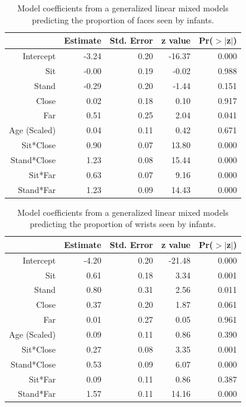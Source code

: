 \documentclass[english,man]{apa6}
\begin{document}
\begin{table}[ht]
\centering
\begin{tabular}{rrrrr}
  \hline
 & Estimate & Std. Error & z value & Pr($>$$|$z$|$) \\ 
  \hline
Intercept & -3.24 & 0.20 & -16.37 & 0.000 \\ 
  Sit & -0.00 & 0.19 & -0.02 & 0.988 \\ 
  Stand & -0.29 & 0.20 & -1.44 & 0.151 \\ 
  Close & 0.02 & 0.18 & 0.10 & 0.917 \\ 
  Far & 0.51 & 0.25 & 2.04 & 0.041 \\ 
  Age (Scaled) & 0.04 & 0.11 & 0.42 & 0.671 \\ 
  Sit*Close & 0.90 & 0.07 & 13.80 & 0.000 \\ 
  Stand*Close & 1.23 & 0.08 & 15.44 & 0.000 \\ 
  Sit*Far & 0.63 & 0.07 & 9.16 & 0.000 \\ 
  Stand*Far & 1.23 & 0.09 & 14.43 & 0.000 \\ 
   \hline
\end{tabular}
\caption{Model coefficients from a generalized linear mixed models predicting the proportion of faces seen by infants.} 
\end{table}

\begin{table}[ht]
\centering
\begin{tabular}{rrrrr}
  \hline
 & Estimate & Std. Error & z value & Pr($>$$|$z$|$) \\ 
  \hline
Intercept & -4.20 & 0.20 & -21.48 & 0.000 \\ 
  Sit & 0.61 & 0.18 & 3.34 & 0.001 \\ 
  Stand & 0.80 & 0.31 & 2.56 & 0.011 \\ 
  Close & 0.37 & 0.20 & 1.87 & 0.061 \\ 
  Far & 0.01 & 0.27 & 0.05 & 0.961 \\ 
  Age (Scaled) & 0.09 & 0.11 & 0.86 & 0.390 \\ 
  Sit*Close & 0.27 & 0.08 & 3.35 & 0.001 \\ 
  Stand*Close & 0.53 & 0.09 & 6.07 & 0.000 \\ 
  Sit*Far & 0.09 & 0.11 & 0.86 & 0.387 \\ 
  Stand*Far & 1.57 & 0.11 & 14.16 & 0.000 \\ 
   \hline
\end{tabular}
\caption{Model coefficients from a generalized linear mixed models predicting the proportion of wrists seen by infants.} 
\end{table}
\end{document}

